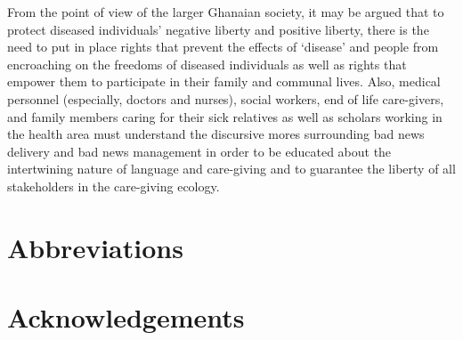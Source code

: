 \documentclass[output=paper,colorlinks,citecolor=brown]{langscibook}
\begin{document}
From the point of view of the larger Ghanaian society, it may be argued that to protect diseased individuals’ negative liberty and positive liberty, there is the need to put in place rights that prevent the effects of ‘disease’ and people from encroaching on the freedoms of diseased individuals as well as rights that empower them to participate in their family and communal lives. Also, medical personnel (especially, doctors and nurses), social workers, end of life care-givers, and family members caring for their sick relatives as well as scholars working in the health area must understand the discursive mores surrounding bad news delivery and bad news management in order to be educated about the intertwining nature of language and care-giving and to guarantee the liberty of all stakeholders in the care-giving ecology.

\section*{Abbreviations}
\section*{Acknowledgements}

\printbibliography[heading=subbibliography,notkeyword=this]
\end{document}
